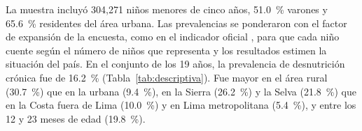 \documentclass[final,5p,times,twocolumn,number,lefttitle]{elsarticle}
\begin{document}
La muestra incluyó 304,271 niños menores de cinco años, 51.0~\% varones y 65.6~\% residentes del área urbana. Las prevalencias se ponderaron con el factor de expansión de la encuesta, como en el indicador oficial \citep{inei2023indicadores}, para que cada niño cuente según el número de niños que representa y los resultados estimen la situación del país. En el conjunto de los 19 años, la prevalencia de desnutrición crónica fue de 16.2~\% (Tabla~\ref{tab:descriptiva}). Fue mayor en el área rural (30.7~\%) que en la urbana (9.4~\%), en la Sierra (26.2~\%) y la Selva (21.8~\%) que en la Costa fuera de Lima (10.0~\%) y en Lima metropolitana (5.4~\%), y entre los 12 y 23 meses de edad (19.8~\%).

\begin{table}[!tp]
\centering
\caption{Características de la muestra y prevalencia ponderada de desnutrición crónica, 2007--2025.}
\label{tab:descriptiva}
\footnotesize
{}
\end{table}
\end{document}
